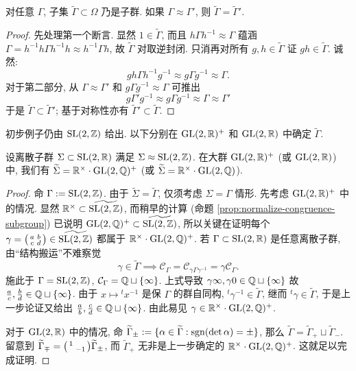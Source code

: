 \begin{lemma}\label{prop:tilde-commensurable}
	对任意 $\Gamma$, 子集 $\widetilde{\Gamma} \subset \Omega$ 乃是子群. 如果 $\Gamma \approx \Gamma'$, 则 $\widetilde{\Gamma} = \widetilde{\Gamma}'$.
\end{lemma}
\begin{proof}
	先处理第一个断言. 显然 $1 \in \widetilde{\Gamma}$, 而且 $h\Gamma h^{-1} \approx \Gamma$ 蕴涵 $\Gamma = h^{-1}h\Gamma h^{-1}h \approx h^{-1}\Gamma h$, 故 $\widetilde{\Gamma}$ 对取逆封闭. 只消再对所有 $g, h \in \widetilde{\Gamma}$ 证 $gh \in \widetilde{\Gamma}$. 诚然:
	\[ gh \Gamma h^{-1}g^{-1} \approx g\Gamma g^{-1} \approx \Gamma. \]
	对于第二部分, 从 $\Gamma \approx \Gamma'$ 和 $g \Gamma g^{-1} \approx \Gamma$ 可推出
	\[ g\Gamma' g^{-1} \approx g \Gamma g^{-1} \approx \Gamma \approx \Gamma' \]
	于是 $\widetilde{\Gamma} \subset \widetilde{\Gamma}'$; 基于对称性亦有 $\widetilde{\Gamma}' \subset \widetilde{\Gamma}$.
\end{proof}

初步例子仍由 $\operatorname{SL}(2,\mathbb{Z})$ 给出. 以下分别在 $\operatorname{GL}(2,\mathbb{R})^+$ 和 $\operatorname{GL}(2,\mathbb{R})$ 中确定 $\widetilde{\Gamma}$.
\begin{proposition}\label{prop:SL2-normalizer}
	设离散子群 $\Sigma \subset \operatorname{SL}(2,\mathbb{R})$ 满足 $\Sigma \approx \operatorname{SL}(2,\mathbb{Z})$. 在大群 $\operatorname{GL}(2,\mathbb{R})^+$ (或 $\operatorname{GL}(2,\mathbb{R})$) 中, 我们有 $\widetilde{\Sigma} = \mathbb{R}^\times \cdot \operatorname{GL}(2,\mathbb{Q})^+$ (或 $\widetilde{\Sigma} = \mathbb{R}^\times \cdot \operatorname{GL}(2,\mathbb{Q})$).
\end{proposition}
\begin{proof}
	命 $\Gamma := \operatorname{SL}(2,\mathbb{Z})$. 由于 $\widetilde{\Sigma} = \widetilde{\Gamma}$, 仅须考虑 $\Sigma = \Gamma$ 情形. 先考虑 $\operatorname{GL}(2,\mathbb{R})^+$ 中的情况. 显然 $\mathbb{R}^\times \subset \widetilde{\operatorname{SL}(2,\mathbb{Z})}$, 而稍早的计算 (命题 \ref{prop:normalize-congruence-subgroup}) 已说明 $\operatorname{GL}(2,\mathbb{Q})^+ \subset \widetilde{\operatorname{SL}(2,\mathbb{Z})}$, 所以关键在证明每个 $\gamma = \bigl(\begin{smallmatrix} a & b \\ c & d \end{smallmatrix}\bigr) \in \widetilde{\operatorname{SL}(2,\mathbb{Z})}$ 都属于 $\mathbb{R}^\times \cdot \operatorname{GL}(2,\mathbb{Q})^+$. 若 $\Gamma \subset \operatorname{SL}(2,\mathbb{R})$ 是任意离散子群, 由``结构搬运''不难察觉
	\[ \gamma \in \widetilde{\Gamma} \implies \mathcal{C}_\Gamma = \mathcal{C}_{\gamma\Gamma\gamma^{-1}} = \gamma\mathcal{C}_\Gamma. \]
	施此于 $\Gamma = \operatorname{SL}(2,\mathbb{Z})$, $\mathcal{C}_\Gamma = \mathbb{Q} \sqcup \{\infty\}$. 上式导致 $\gamma\infty, \gamma 0 \in \mathbb{Q} \sqcup \{\infty\}$ 故 $\frac{a}{c}, \frac{b}{d} \in \mathbb{Q} \sqcup\{\infty\}$. 由于 $x \mapsto {}^t x^{-1}$ 是保 $\Gamma$ 的群自同构, ${}^t \gamma^{-1} \in \widetilde{\Gamma}$, 继而 ${}^t \gamma \in \widetilde{\Gamma}$, 于是上一步论证又给出 $\frac{a}{b}, \frac{c}{d} \in \mathbb{Q} \sqcup \{\infty\}$. 由此易见 $\gamma \in \mathbb{R}^\times \cdot \operatorname{GL}(2,\mathbb{Q})^+$.
	
	对于 $\operatorname{GL}(2,\mathbb{R})$ 中的情况, 命 $\widetilde{\Gamma}_\pm := \{ \alpha \in \widetilde{\Gamma}: \operatorname{sgn}(\det \alpha) = \pm \}$, 那么 $\widetilde{\Gamma} = \widetilde{\Gamma}_+ \sqcup \widetilde{\Gamma}_-$. 留意到 $\widetilde{\Gamma}_\mp = \bigl(\begin{smallmatrix} 1 &  \\  & -1 \end{smallmatrix}\bigr) \widetilde{\Gamma}_\pm$, 而 $\widetilde{\Gamma}_+$ 无非是上一步确定的 $\mathbb{R}^\times \cdot \operatorname{GL}(2,\mathbb{Q})^+$. 这就足以完成证明.
\end{proof}

